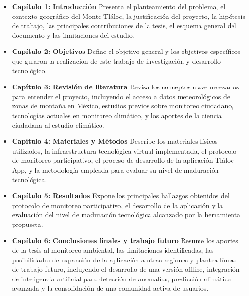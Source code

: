 \begin{itemize}
    \item \textbf{Capítulo 1: Introducción} Presenta el planteamiento del problema, el contexto geográfico del Monte Tláloc, la justificación del proyecto, la hipótesis de trabajo, las principales contribuciones de la tesis, el esquema general del documento y las limitaciones del estudio.
    
    \item \textbf{Capítulo 2: Objetivos} Define el objetivo general y los objetivos específicos que guiaron la realización de este trabajo de investigación y desarrollo tecnológico.
    
    \item \textbf{Capítulo 3: Revisión de literatura} Revisa los conceptos clave necesarios para entender el proyecto, incluyendo el acceso a datos meteorológicos de zonas de montaña en México, estudios previos sobre monitoreo ciudadano, tecnologías actuales en monitoreo climático, y los aportes de la ciencia ciudadana al estudio climático.
    
    \item \textbf{Capítulo 4: Materiales y Métodos} Describe los materiales físicos utilizados, la infraestructura tecnológica virtual implementada, el protocolo de monitoreo participativo, el proceso de desarrollo de la aplicación Tláloc App, y la metodología empleada para evaluar su nivel de maduración tecnológica.
    
    \item \textbf{Capítulo 5: Resultados} Expone los principales hallazgos obtenidos del protocolo de monitoreo participativo, el desarrollo de la aplicación y la evaluación del nivel de maduración tecnológica alcanzado por la herramienta propuesta.
    
    \item \textbf{Capítulo 6: Conclusiones finales y trabajo futuro} Resume los aportes de la tesis al monitoreo ambiental, las limitaciones identificadas, las posibilidades de expansión de la aplicación a otras regiones y plantea líneas de trabajo futuro, incluyendo el desarrollo de una versión offline, integración de inteligencia artificial para detección de anomalías, predicción climática avanzada y la consolidación de una comunidad activa de usuarios.
\end{itemize}




